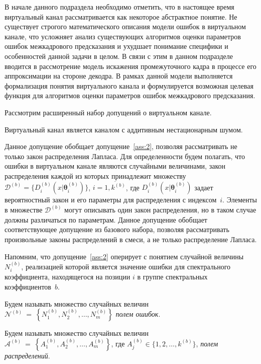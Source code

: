 В начале данного подраздела необходимо отметить, что в настоящее время виртуальный канал рассматривается как некоторое абстрактное понятие. Не существует строгого математического описания модели ошибок в виртуальном канале, что усложняет анализ существующих алгоритмов оценки параметров ошибок межкадрового предсказания и ухудшает понимание специфики и особенностей данной задачи в целом. В связи с этим в данном подразделе вводится в рассмотрение модель искажения промежуточного кадра в процессе его аппроксимации на стороне декодра. В рамках данной модели выполняется формализация понятия виртуального канала и формулируется возможная целевая функция для алгоритмов оценки параметров ошибок межкадрового предсказания.

Рассмотрим расширенный набор допущений о виртуальном канале.

\setcounter{assumptionext}{1}
\begin{assumptionext}[*]
    Виртуальный канал является каналом с аддитивным нестационарным шумом.
    \label{ass:2new}
\end{assumptionext}
Данное допущение обобщает допущение~\ref{ass:2}, позволяя рассматривать не только закон распределения Лапласа. Для определенности будем полагать, что ошибки в виртуальном канале являются случайными величинами, закон распределения каждой из которых принадлежит множеству $\mathcal{D}^{(b)}=\{ D^{(b)}_i(x \vert \boldsymbol{\theta}^{(b)}_i) \}$, $i=\overline{1,k^{(b)}}$, где $D^{(b)}_i(x \vert \boldsymbol{\theta}^{(b)}_i)$ задает вероятностный закон и его параметры для распределения с индексом~$i$. Элементы в множестве $\mathcal{D}^{(b)}$ могут описывать один закон распределения, но в таком случае должны различаться по параметрам. Данное допущение обобщает соответствующее допущение из базового набора, позволяя рассматривать произвольные законы распределений в смеси, а не только распределение Лапласа.

Напомним, что допущение~\ref{ass:2} оперирует с понятием случайной величины $N_i^{(b)}$, реализацией которой является значение ошибки для спектрального коэффициента, находящегося на позиции $i$ в группе спектральных коэффициентов~$b$.

\begin{definition}
    Будем называть множество случайных величин $\mathcal{N}^{(b)}~=~ \left\lbrace N^{(b)}_1, N^{(b)}_2, \ldots, N^{(b)}_m \right\rbrace $ \emph{полем ошибок}.
\end{definition}

\begin{definition}
    Будем называть множество случайных величин $\mathcal{A}^{(b)}~=~ \left\lbrace A^{(b)}_1, A^{(b)}_2, \ldots, A^{(b)}_m \right\rbrace$, где $A^{(b)}_j \in \{1,2,\ldots,k^{(b)}\}$, \emph{полем распределений}.
\end{definition}

